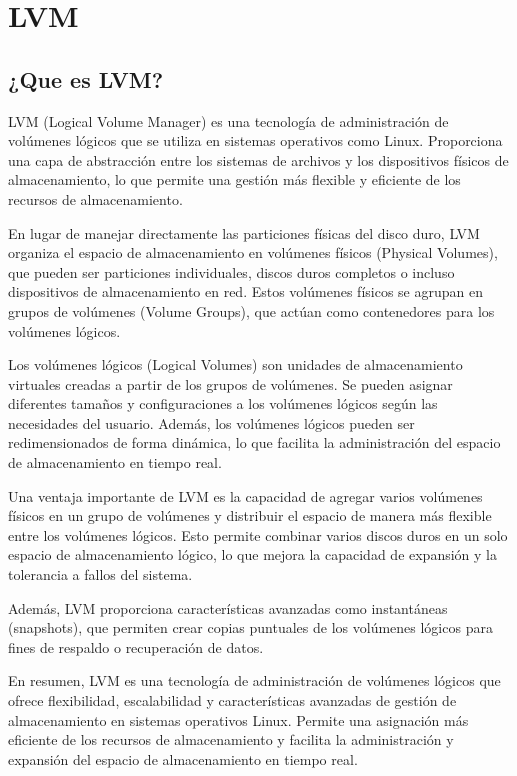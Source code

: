	
	\section{LVM}
	
		\subsection{¿Que es LVM?}
		
			LVM (Logical Volume Manager) es una tecnología de administración de volúmenes lógicos que se utiliza en sistemas operativos como Linux. Proporciona una capa de abstracción entre los sistemas de archivos y los dispositivos físicos de almacenamiento, lo que permite una gestión más flexible y eficiente de los recursos de almacenamiento.\par

			En lugar de manejar directamente las particiones físicas del disco duro, LVM organiza el espacio de almacenamiento en volúmenes físicos (Physical Volumes), que pueden ser particiones individuales, discos duros completos o incluso dispositivos de almacenamiento en red. Estos volúmenes físicos se agrupan en grupos de volúmenes (Volume Groups), que actúan como contenedores para los volúmenes lógicos.\par

			Los volúmenes lógicos (Logical Volumes) son unidades de almacenamiento virtuales creadas a partir de los grupos de volúmenes. Se pueden asignar diferentes tamaños y configuraciones a los volúmenes lógicos según las necesidades del usuario. Además, los volúmenes lógicos pueden ser redimensionados de forma dinámica, lo que facilita la administración del espacio de almacenamiento en tiempo real.\par

			Una ventaja importante de LVM es la capacidad de agregar varios volúmenes físicos en un grupo de volúmenes y distribuir el espacio de manera más flexible entre los volúmenes lógicos. Esto permite combinar varios discos duros en un solo espacio de almacenamiento lógico, lo que mejora la capacidad de expansión y la tolerancia a fallos del sistema.\par

			Además, LVM proporciona características avanzadas como instantáneas (snapshots), que permiten crear copias puntuales de los volúmenes lógicos para fines de respaldo o recuperación de datos.\par

			En resumen, LVM es una tecnología de administración de volúmenes lógicos que ofrece flexibilidad, escalabilidad y características avanzadas de gestión de almacenamiento en sistemas operativos Linux. Permite una asignación más eficiente de los recursos de almacenamiento y facilita la administración y expansión del espacio de almacenamiento en tiempo real.\par
			
